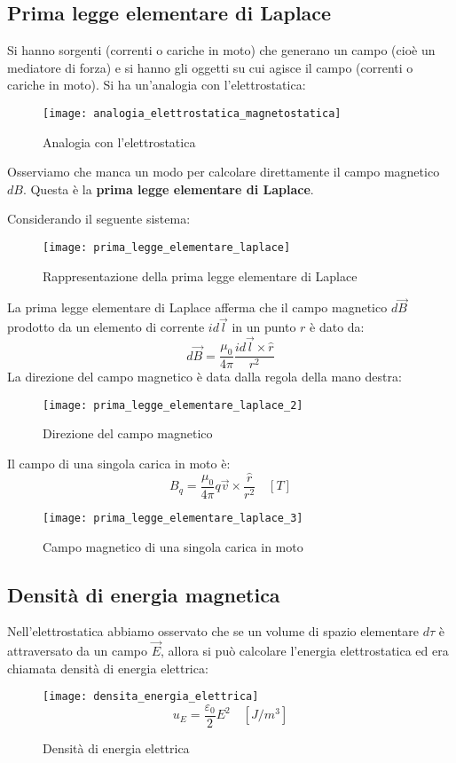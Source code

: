 \documentclass[a4paper]{article}
\begin{document}
\subsection{Prima legge elementare di Laplace}
Si hanno sorgenti (correnti o cariche in moto) che generano un campo (cioè un mediatore
di forza) e si hanno gli oggetti su cui agisce il campo (correnti o cariche in moto).
Si ha un'analogia con l'elettrostatica:
\begin{figure}[H]
  \centering
  \texttt{[image: analogia\_elettrostatica\_magnetostatica]}
  \caption{Analogia con l'elettrostatica}
\end{figure}
\noindent
Osserviamo che manca un modo per calcolare direttamente il campo magnetico \( dB \). 
Questa è la \textbf{prima legge elementare di Laplace}.

\begin{definition}
  Considerando il seguente sistema:
  \begin{figure}[H]
    \centering
    \texttt{[image: prima\_legge\_elementare\_laplace]}
    \caption{Rappresentazione della prima legge elementare di Laplace}
  \end{figure}
  \noindent
  La prima legge elementare di Laplace afferma che il campo magnetico \( d\vec{B} \)
  prodotto da un elemento di corrente \( i d\vec{l} \) in un punto \( r \) è dato da:
  \[
    d\vec{B} = \frac{\mu_0}{4 \pi} \frac{i d\vec{l} \times \hat{r}}{r^2}
  \] 
  La direzione del campo magnetico è data dalla regola della mano destra:
  \begin{figure}[H]
    \centering
    \texttt{[image: prima\_legge\_elementare\_laplace\_2]}
    \caption{Direzione del campo magnetico}
  \end{figure}
  \noindent
  Il campo di una singola carica in moto è:
  \[
    B_q = \frac{\mu_0}{4 \pi} q \vec{v} \times \frac{\hat{r}}{r^2} \quad \left[ T \right]
  \] 
  \begin{figure}[H]
    \centering
    \texttt{[image: prima\_legge\_elementare\_laplace\_3]}
    \caption{Campo magnetico di una singola carica in moto}
  \end{figure}
\end{definition}

\subsection{Densità di energia magnetica}
Nell'elettrostatica abbiamo osservato che se un volume di spazio elementare \( d \tau \)
è attraversato da un campo \( \vec{E} \), allora si può calcolare l'energia elettrostatica
ed era chiamata densità di energia elettrica:
\begin{figure}[H]
  \centering
  \texttt{[image: densita\_energia\_elettrica]}
  \[
    u_E = \frac{\varepsilon_0}{2} E^2 \quad \left[ J/m^3 \right]
  \] 
  \caption{Densità di energia elettrica}
\end{figure}
\end{document}
